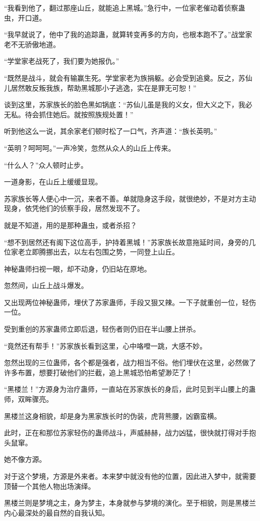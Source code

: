 \begin{this_body}
“我看到他了，翻过那座山丘，就能追上黑城。”急行中，一位家老催动着侦察蛊虫，开口道。

“我早就说了，他中了我的追踪蛊，就算转变再多的方向，也根本跑不了。”战堂家老不无骄傲地道。

“学堂家老战死了，我们要为她报仇。”

“既然是战斗，就会有输赢生死。学堂家老为族捐躯。必会受到追奠。反之，苏仙儿居然敢反叛我族，帮助黑城那小子逃逸，实在是罪无可恕！”

谈到这里，苏家族长的脸色黑如锅底：“苏仙儿虽是我的义女，但大义之下，我必无私。待会抓住她后。就按照族规处置！”

听到他这么一说，其余家老们顿时松了一口气，齐声道：“族长英明。”

“英明？呵呵呵。”一声冷笑，忽然从众人的山丘上传来。

“什么人？”众人顿时止步。

一道身影，在山丘上缓缓显现。

苏家族长等人便心中一沉，来者不善。单就隐身这手段，就很绝妙，不是对方主动现身，依凭他们的侦察手段，居然发现不了。

就是不知道，用的是那种蛊虫，或者杀招？

“想不到居然还有阁下这位高手，护持着黑城！”苏家族长故意拖延时间，身旁的几位家老立即腾挪出去，以左右包围之势，一同登上山丘。

神秘蛊师扫视一眼，却不动身，仍旧站在原地。

忽然间，山丘上战斗爆发。

又出现两位神秘蛊师，埋伏了苏家蛊师，手段又狠又辣。一下子就重创一位，轻伤一位。

受到重创的苏家蛊师立即后退，轻伤者则仍旧在半山腰上拼杀。

“竟然还有帮手！”苏家族长看到这里，心中咯噔一跳，大感不妙。

忽然出现的三位蛊师，各个都是强者，战力相当不俗。他们埋伏在这里，必然做了许多布置，想要打破他们的拦截，追上黑城恐怕希望渺茫了！

“黑楼兰！”方源身为治疗蛊师，一直站在苏家族长的身后，此时见到半山腰上的蛊师，双眸骤亮。

黑楼兰这身相貌，却是身为黑家族长时的伪装，虎背熊腰，凶霸蛮横。

此时，正在和那位苏家轻伤的蛊师战斗，声威赫赫，战力凶猛，很快就打得对手抱头鼠窜。

她不像方源。

对于这个梦境，方源是外来者。本来梦中就没有他的位置，因此进入梦中，就需要顶替一个其他人物出场演绎。

黑楼兰则是梦境之主，身为梦主，本身就参与梦境的演化。至于相貌，则是黑楼兰内心最深处的最自然的自我认知。


\end{this_body}

